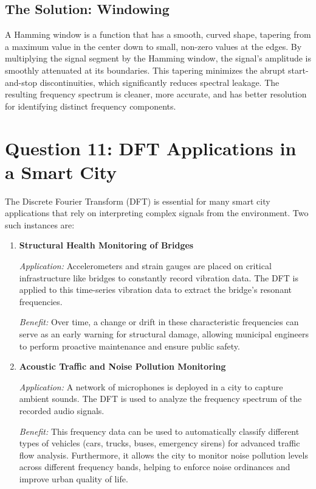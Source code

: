 \documentclass[a4paper,12pt]{article}
\begin{document}
\subsection*{The Solution: Windowing}
A Hamming window is a function that has a smooth, curved shape, tapering from a maximum value in the center down to small, non-zero values at the edges. By multiplying the signal segment by the Hamming window, the signal's amplitude is smoothly attenuated at its boundaries. This tapering minimizes the abrupt start-and-stop discontinuities, which significantly reduces spectral leakage. The resulting frequency spectrum is cleaner, more accurate, and has better resolution for identifying distinct frequency components.

\section{Question 11: DFT Applications in a Smart City}
The Discrete Fourier Transform (DFT) is essential for many smart city applications that rely on interpreting complex signals from the environment. Two such instances are:

\begin{enumerate}
    \item \textbf{Structural Health Monitoring of Bridges}
    
    \textit{Application:} Accelerometers and strain gauges are placed on critical infrastructure like bridges to constantly record vibration data. The DFT is applied to this time-series vibration data to extract the bridge's resonant frequencies.
    
    \textit{Benefit:} Over time, a change or drift in these characteristic frequencies can serve as an early warning for structural damage, allowing municipal engineers to perform proactive maintenance and ensure public safety.

    \item \textbf{Acoustic Traffic and Noise Pollution Monitoring}
    
    \textit{Application:} A network of microphones is deployed in a city to capture ambient sounds. The DFT is used to analyze the frequency spectrum of the recorded audio signals.
    
    \textit{Benefit:} This frequency data can be used to automatically classify different types of vehicles (cars, trucks, buses, emergency sirens) for advanced traffic flow analysis. Furthermore, it allows the city to monitor noise pollution levels across different frequency bands, helping to enforce noise ordinances and improve urban quality of life.
\end{enumerate}
\end{document}
